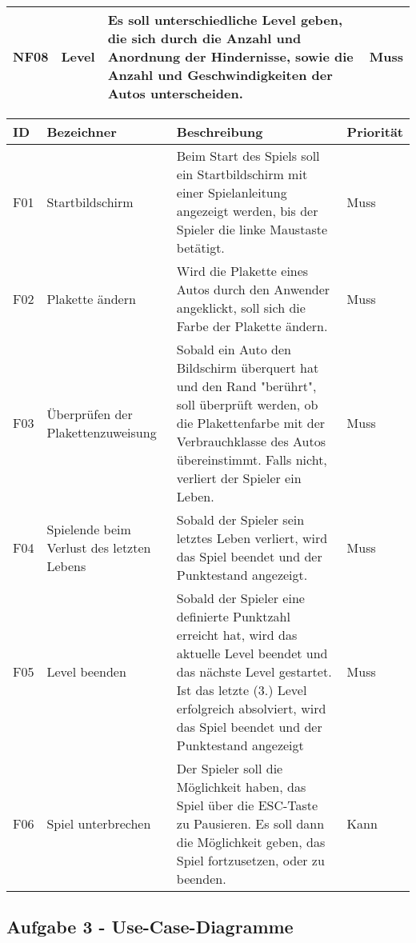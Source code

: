 \begin{center}
\begin{tabular}{|m{1cm}|m{4cm}|m{8cm}|m{2cm}|}
		\hline
		NF08 & Level & Es soll unterschiedliche Level geben, die sich durch die Anzahl und Anordnung der Hindernisse, sowie die Anzahl und Geschwindigkeiten der Autos unterscheiden. & Muss \\
		\hline
	\end{tabular}
	\begin{tabular}{|m{1cm}|m{4cm}|m{8cm}|m{2cm}|}
		\hline
		ID & Bezeichner & Beschreibung & Priorität \\
		\hline
		F01 & Startbildschirm & Beim Start des Spiels soll ein Startbildschirm mit einer Spielanleitung angezeigt werden, bis der Spieler die linke Maustaste betätigt. & Muss \\
		\hline
		F02 & Plakette ändern & Wird die Plakette eines Autos durch den Anwender angeklickt, soll sich die Farbe der Plakette ändern. & Muss \\
		\hline
		F03 & Überprüfen der Plakettenzuweisung & Sobald ein Auto den Bildschirm überquert hat und den Rand "berührt", soll überprüft werden, ob die Plakettenfarbe mit der Verbrauchklasse des Autos übereinstimmt. Falls nicht, verliert der Spieler ein Leben. & Muss \\
		\hline
		F04 & Spielende beim Verlust des letzten Lebens & Sobald der Spieler sein letztes Leben verliert, wird das Spiel beendet und der Punktestand angezeigt. & Muss \\
		\hline
		F05 & Level beenden & Sobald der Spieler eine definierte Punktzahl erreicht hat, wird das aktuelle Level beendet und das nächste Level gestartet. Ist das letzte (3.) Level erfolgreich absolviert, wird das Spiel beendet und der Punktestand angezeigt & Muss \\
		\hline
		F06 & Spiel unterbrechen & Der Spieler soll die Möglichkeit haben, das Spiel über die ESC-Taste zu Pausieren. Es soll dann die Möglichkeit geben, das Spiel fortzusetzen, oder zu beenden. & Kann \\
		\hline
	\end{tabular}
\end{center}
\subsection{Aufgabe 3 - Use-Case-Diagramme}

